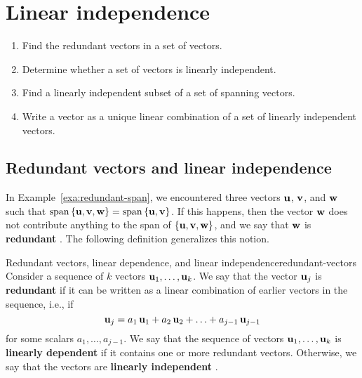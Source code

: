 \section{Linear independence}

\begin{outcome}
  \begin{enumerate}
  \item Find the redundant vectors in a set of vectors.
  \item Determine whether a set of vectors is linearly independent.
  \item Find a linearly independent subset of a set of spanning vectors.
  \item Write a vector as a unique linear combination of a set of
    linearly independent vectors.
  \end{enumerate}
\end{outcome}

\subsection{Redundant vectors and linear independence}

In Example~\ref{exa:redundant-span}, we encountered three vectors
$\mbox{\bf u}$, $\mbox{\bf v}$, and $\mbox{\bf w}$ such that
$\sspan\set{\vect{u},\vect{v},\vect{w}} =
\sspan\set{\vect{u},\vect{v}}$.  If this happens, then the vector
$\mbox{\bf w}$ does not contribute anything to the span of
$\left\{\mbox{\bf u},\mbox{\bf v},\mbox{\bf w}\right\}$, and we say that $\mbox{\bf w}$ is
\textbf{redundant}%
. The following
definition generalizes this notion.

\begin{definition}{Redundant vectors, linear dependence, and linear independence}{redundant-vectors}
  Consider a sequence of $k$ vectors $\mbox{\bf u}_1,\ldots,\mbox{\bf u}_k$.  We
  say that the vector $\mbox{\bf u}_j$ is \textbf{redundant}%
   if it can be
  written as a linear combination of earlier vectors in the sequence,
  i.e., if
  \begin{equation*}
    \mbox{\bf u}_j = a_1\,\mbox{\bf u}_1 + a_2\,\mbox{\bf u}_2 + \ldots + a_{j-1}\,\mbox{\bf u}_{j-1}
  \end{equation*}
  for some scalars $a_1,\ldots,a_{j-1}$. We say that the sequence of
  vectors $\mbox{\bf u}_1,\ldots,\mbox{\bf u}_k$ is \textbf{linearly
    dependent}%
   if it
  contains one or more redundant vectors. Otherwise, we say that the
  vectors are \textbf{linearly independent}%
  .  
\end{definition}

